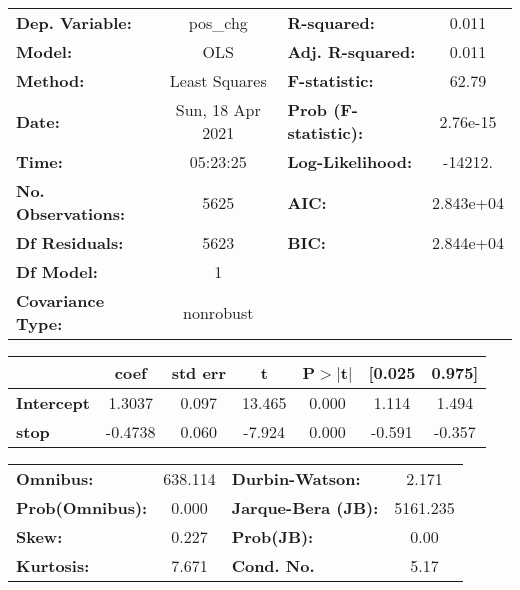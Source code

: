 \begin{center}
\begin{tabular}{lclc}
\toprule
\textbf{Dep. Variable:}    &     pos\_chg     & \textbf{  R-squared:         } &     0.011  \\
\textbf{Model:}            &       OLS        & \textbf{  Adj. R-squared:    } &     0.011  \\
\textbf{Method:}           &  Least Squares   & \textbf{  F-statistic:       } &     62.79  \\
\textbf{Date:}             & Sun, 18 Apr 2021 & \textbf{  Prob (F-statistic):} &  2.76e-15  \\
\textbf{Time:}             &     05:23:25     & \textbf{  Log-Likelihood:    } &   -14212.  \\
\textbf{No. Observations:} &        5625      & \textbf{  AIC:               } & 2.843e+04  \\
\textbf{Df Residuals:}     &        5623      & \textbf{  BIC:               } & 2.844e+04  \\
\textbf{Df Model:}         &           1      & \textbf{                     } &            \\
\textbf{Covariance Type:}  &    nonrobust     & \textbf{                     } &            \\
\bottomrule
\end{tabular}
\end{center}\begin{center}
\begin{tabular}{lcccccc}
\toprule
                   & \textbf{coef} & \textbf{std err} & \textbf{t} & \textbf{P$> |$t$|$} & \textbf{[0.025} & \textbf{0.975]}  \\
\midrule
\textbf{Intercept} &       1.3037  &        0.097     &    13.465  &         0.000        &        1.114    &        1.494     \\
\textbf{stop}      &      -0.4738  &        0.060     &    -7.924  &         0.000        &       -0.591    &       -0.357     \\
\bottomrule
\end{tabular}
\end{center}\begin{center}
\begin{tabular}{lclc}
\toprule
\textbf{Omnibus:}       & 638.114 & \textbf{  Durbin-Watson:     } &    2.171  \\
\textbf{Prob(Omnibus):} &   0.000 & \textbf{  Jarque-Bera (JB):  } & 5161.235  \\
\textbf{Skew:}          &   0.227 & \textbf{  Prob(JB):          } &     0.00  \\
\textbf{Kurtosis:}      &   7.671 & \textbf{  Cond. No.          } &     5.17  \\
\bottomrule
\end{tabular}
\end{center}